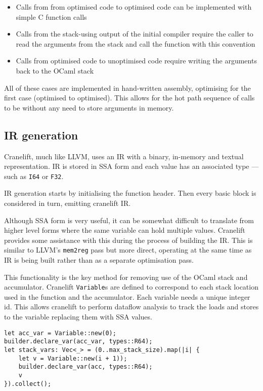 \begin{itemize}
      \item Calls from from optimised code to optimised code can be implemented with simple C
            function calls
      \item Calls from the stack-using output of the initial compiler require the caller to read
            the arguments
            from the stack and call the function with this convention
      \item Calls from optimised code to unoptimised
            code require writing the arguments back to the OCaml stack
\end{itemize}

All of these cases are implemented in hand-written assembly, optimising for the first case
(optimised to optimised). This allows for the hot path sequence of calls to be without any need to
store arguments in memory.

\subsection{IR generation} \label{opt-irgen}

Cranelift, much like LLVM, uses an IR with a binary, in-memory and textual representation. IR is
stored in SSA form and each value has an associated type --- such as \texttt{I64} or \texttt{F32}.

IR generation starts by initialising the function header. Then every basic block is considered in
turn, emitting cranelift IR.

Although SSA form is very useful, it can be somewhat difficult to translate from higher level forms
where the same variable can hold multiple values. Cranelift provides some assistance with this
during the process of building the IR. This is similar to LLVM's \texttt{mem2reg} pass but more
direct, operating at the same time as IR is being built rather than as a separate optimisation
pass.

This functionality is the key method for removing use of the OCaml stack and accumulator. Cranelift
\texttt{Variable}s are defined to correspond to each stack location used in the function and the
accumulator.
Each variable needs a unique integer id. This allows cranelift to perform dataflow analysis to
track the loads and stores to the variable replacing them with SSA values.

\begin{verbatim}
let acc_var = Variable::new(0);
builder.declare_var(acc_var, types::R64);
let stack_vars: Vec<_> = (0..max_stack_size).map(|i| {
    let v = Variable::new(i + 1));
    builder.declare_var(acc, types::R64);
    v
}).collect();
\end{verbatim}

